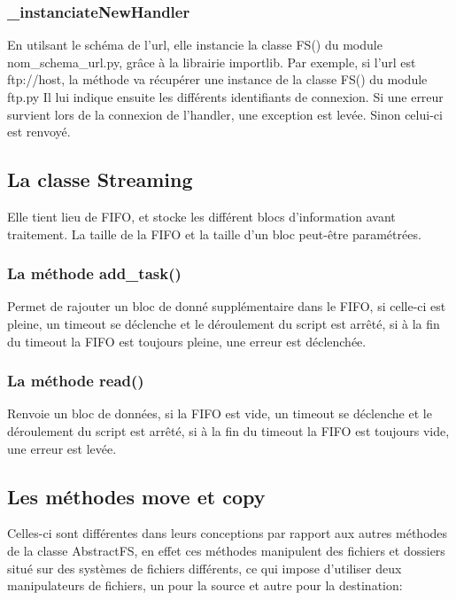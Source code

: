 \subsubsection*{\_instanciateNewHandler}
En utilsant le schéma de l'url, elle instancie la classe FS() du module nom\_schema\_url.py, grâce à la librairie importlib.
Par exemple, si l'url est ftp://host, la méthode va récupérer une instance de la classe FS() du module ftp.py
Il lui indique ensuite les différents identifiants de connexion. Si une erreur survient lors de la connexion de l'handler, une exception est levée.
Sinon celui-ci est renvoyé.


\subsection*{La classe Streaming}

Elle tient lieu de FIFO, et stocke les différent blocs d'information avant traitement.
La taille de la FIFO et la taille d'un bloc peut-être paramétrées.
	
\subsubsection*{La méthode add\_task()}
	
Permet de rajouter un bloc de donné supplémentaire dans le FIFO, si celle-ci est pleine, un timeout se déclenche et le déroulement du script est arrêté, si à la fin du timeout la FIFO est toujours pleine, une erreur est déclenchée.

\subsubsection*{La méthode read()}
Renvoie un bloc de données, si la FIFO est vide, un timeout se déclenche et le déroulement du script est arrêté, si à la fin du timeout la FIFO est toujours vide, une erreur est levée.

\newpage

\subsection*{Les méthodes move et copy}
Celles-ci sont différentes dans leurs conceptions par rapport aux autres méthodes de la classe AbstractFS, en effet ces méthodes manipulent des fichiers et dossiers situé sur des systèmes de fichiers différents, ce qui impose d'utiliser deux manipulateurs de fichiers, un pour la source et autre pour la destination:

